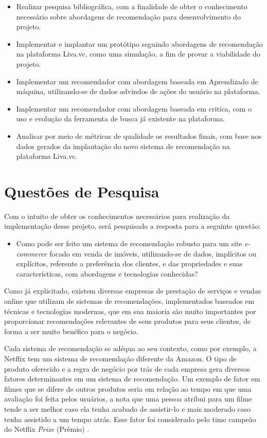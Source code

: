 \begin{itemize}
    \item Realizar pesquisa bibliográfica, com a finalidade de obter o conhecimento necessário sobre abordagens de recomendação para desenvolvimento do projeto.
    \item Implementar e implantar um protótipo seguindo abordagens de recomendação na plataforma Liva.vc, como uma simulação, a fim de provar a viabilidade do projeto.
    \item Implementar um recomendador com abordagem baseada em Aprendizado de máquina, utilizando-se de dados advindos de ações do usuário na plataforma.
    \item Implementar um recomendador com abordagem baseada em critica, com o uso e evolução da ferramenta de busca já existente na plataforma.
    \item Analisar por meio de métricas de qualidade os resultados finais, com base nos dados gerados da implantação do novo sistema de recomendação na plataforma Liva.vc.
\end{itemize}

\section{Questões de Pesquisa}

Com o intuito de obter os conhecimentos necessários para realização da implementação desse projeto, será pesquisado a resposta para a seguinte questão:
\begin{itemize}
    \item Como pode ser feito um sistema de recomendação robusto para um site \textit{e-commerce} focado em venda de imóveis, utilizando-se de dados, implícitos ou explícitos, referente a preferência dos clientes, e das propriedades e suas características, com abordagens e tecnologias conhecidas?
\end{itemize}

Como já explicitado, existem diversas empresas de prestação de serviços e vendas online que utilizam de sistemas de recomendações, implementados baseados em técnicas e tecnologias modernas, que em sua maioria são muito importantes por proporcionar recomendações relevantes de seus produtos para seus clientes, de forma a ser muito benéfico para o negócio. 

Cada sistema de recomendação se adéqua ao seu contexto, como por exemplo, a Netflix tem um sistema de recomendação diferente da Amazon. O tipo de produto oferecido e a regra de negócio por trás de cada empresa gera diversos fatores determinantes em um sistema de recomendação. Um exemplo de fator em filmes que se difere de outros produtos seria em relação ao tempo em que uma avaliação foi feita pelos usuários, a nota que uma pessoa atribui para um filme tende a ser melhor caso ela tenha acabado de assistir-lo e mais moderado caso tenha assistido a um tempo atrás. Esse fator foi considerado pelo time campeão do Netflix \textit{Prize} (Prêmio) \cite{GARCIA:2015}.
 
